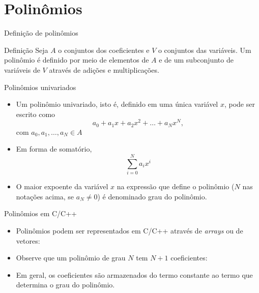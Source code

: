 \section*{Polinômios}

\begin{frame}[fragile]{Definição de polinômios}

    \begin{block}{Definição}
Seja $A$ o conjuntos dos coeficientes e $V$ o conjuntos das variáveis. Um polinômio é definido por meio de elementos de $A$ e de um subconjunto de variáveis de $V$ através de adições e multiplicações.
    \end{block}

\end{frame}

\begin{frame}[fragile]{Polinômios univariados}

    \begin{itemize}
        \item Um polinômio univariado, isto é, definido em uma única variável $x$, pode ser escrito como
$$
a_0 + a_1x + a_2x^2 + \ldots + a_Nx^N,
$$
        com $a_0, a_1, \ldots, a_N\in A$

        \item Em forma de somatório,
$$
\sum_{i = 0}^N a_ix^i
$$

        \item O maior expoente da variável $x$ na expressão que define o polinômio ($N$ nas notações acima, se $a_N\neq 0$) é denominado grau do polinômio.
    \end{itemize}

\end{frame}

\begin{frame}[fragile]{Polinômios em C/C++}

    \begin{itemize}
        \item Polinômios podem ser representados em C/C++ através de \textit{arrays} ou de vetores:


        \item Observe que um polinômio de grau $N$ tem $N + 1$ coeficientes:


        \item Em geral, os coeficientes são armazenados do termo constante ao termo que determina o grau do polinômio.

    \end{itemize}

\end{frame}

